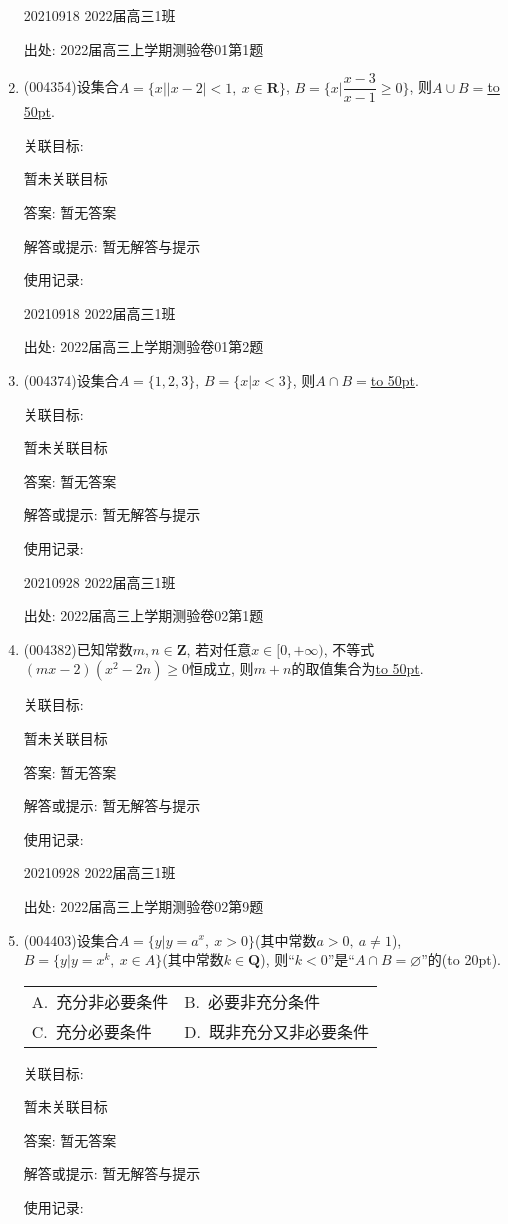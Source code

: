 \documentclass[10pt,a4paper]{article}
\newcommand{\blank}[1]{\underline{\hbox to #1pt{}}}
\newcommand{\bracket}[1]{(\hbox to #1pt{})}
\newcommand{\twoch}[4]{\par\begin{tabular}{p{.46\textwidth}p{.46\textwidth}}
A.~#1& B.~#2\\
C.~#3& D.~#4
\end{tabular}}
\begin{document}
\begin{enumerate}[1.]
20210918	2022届高三1班	


出处: 2022届高三上学期测验卷01第1题
\item { (004354)}设集合$A=\{x||x-2|<1, \ x\in\mathbf{R}\}$, $B=\{x|\dfrac{x-3}{x-1}\ge 0\}$, 则$A\cup B=$\blank{50}.


关联目标:

暂未关联目标

答案: 暂无答案

解答或提示: 暂无解答与提示

使用记录:

20210918	2022届高三1班	


出处: 2022届高三上学期测验卷01第2题
\item { (004374)}设集合$A=\{1,2,3\}$, $B=\{x|x<3\}$, 则$A\cap B=$\blank{50}.


关联目标:

暂未关联目标

答案: 暂无答案

解答或提示: 暂无解答与提示

使用记录:

20210928	2022届高三1班	


出处: 2022届高三上学期测验卷02第1题
\item { (004382)}已知常数$m,n\in \mathbf{Z}$, 若对任意$x\in [0,+\infty)$, 不等式$(mx-2)(x^2-2n)\ge 0$恒成立, 则$m+n$的取值集合为\blank{50}.


关联目标:

暂未关联目标

答案: 暂无答案

解答或提示: 暂无解答与提示

使用记录:

20210928	2022届高三1班	


出处: 2022届高三上学期测验卷02第9题
\item { (004403)}设集合$A=\{y|y=a^x,\ x>0\}$(其中常数$a>0,  \ a\ne 1$), $B=\{y|y=x^k,\ x\in A\}$(其中常数$k\in \mathbf{Q}$), 则``$k<0$''是``$A\cap B=\varnothing$''的\bracket{20}.
\twoch{充分非必要条件}{必要非充分条件}{充分必要条件}{既非充分又非必要条件}


关联目标:

暂未关联目标

答案: 暂无答案

解答或提示: 暂无解答与提示

使用记录:


\end{enumerate}
\end{document}
